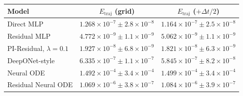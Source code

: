 \begin{tabular}{lcc}
\toprule
Model & $E_{\mathrm{traj}}$ (grid) & $E_{\mathrm{traj}}$ ($+\Delta t/2$) \\
\midrule
Direct MLP & $1.268{\times}10^{-7} \pm 2.8{\times}10^{-8}$ & $1.164{\times}10^{-7} \pm 2.5{\times}10^{-8}$ \\
Residual MLP & $4.772{\times}10^{-9} \pm 1.1{\times}10^{-9}$ & $5.062{\times}10^{-9} \pm 1.1{\times}10^{-9}$ \\
PI-Residual, $\lambda=0.1$ & $1.927{\times}10^{-8} \pm 6.8{\times}10^{-9}$ & $1.821{\times}10^{-8} \pm 6.3{\times}10^{-9}$ \\
DeepONet-style & $6.335{\times}10^{-7} \pm 1.1{\times}10^{-7}$ & $5.845{\times}10^{-7} \pm 8.2{\times}10^{-8}$ \\
Neural ODE & $1.492{\times}10^{-4} \pm 3.4{\times}10^{-4}$ & $1.499{\times}10^{-4} \pm 3.4{\times}10^{-4}$ \\
Residual Neural ODE & $1.069{\times}10^{-6} \pm 3.8{\times}10^{-7}$ & $1.084{\times}10^{-6} \pm 3.9{\times}10^{-7}$ \\
\bottomrule
\end{tabular}
